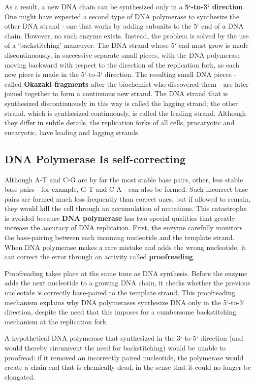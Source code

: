 As a result, a new DNA chain can be synthesized only
in a \textbf{5`-to-3` direction}. One
might have expected a second type of DNA polymerase to synthesize the
other DNA strand - one that works by adding subunits to the 5` end of
a DNA chain. However, no such enzyme exists. Instead, the problem is
solved by the use of a ‘backstitching’ maneuver. The DNA strand whose
5` end must grow is made discontinuously, in successive separate small
pieces, with the DNA polymerase moving backward with respect to the
direction of the replication fork, as each new piece is made in the 5`-to-3`
direction.
The resulting small DNA pieces - called \textbf{Okazaki fragments} after the
biochemist who discovered them - are later joined together to form a
continuous new strand. The DNA strand that is synthesized
discontinuously in this way is called the lagging strand; the other strand,
which is synthesized continuously, is called the leading strand.
Although they differ in subtle details, the replication forks of all cells,
procaryotic and eucaryotic, have leading and lagging strands

\subsection{DNA Polymerase Is self-correcting}

Although A-T and C-G are by far the most stable base pairs, other, less
stable base pairs - for example, G-T and C-A - can also be formed. Such
incorrect base pairs are formed much less frequently than correct ones,
but if allowed to remain, they would kill the cell through an accumulation
of mutations. This catastrophe is avoided because \textbf{DNA polymerase}
has two special qualities that greatly increase the accuracy of DNA replication.
First, the enzyme carefully monitors the base-pairing between
each incoming nucleotide and the template strand.
When DNA polymerase makes a rare mistake and adds
the wrong nucleotide, it can correct the error through an activity called
\textbf{proofreading}.

Proofreading takes place at the same time as DNA synthesis. Before
the enzyme adds the next nucleotide to a growing DNA chain, it checks
whether the previous nucleotide is correctly base-paired to the template
strand. This proofreading mechanism explains why DNA polymerases synthesize
DNA only in the 5`-to-3` direction, despite the need that this imposes for a
cumbersome backstitching mechanism at the replication fork.

A hypothetical DNA polymerase that synthesized in the
3`-to-5` direction (and would thereby circumvent the need for backstitching)
would be unable to proofread: if it removed an incorrectly paired
nucleotide, the polymerase would create a chain end that is chemically
dead, in the sense that it could no longer be elongated.

